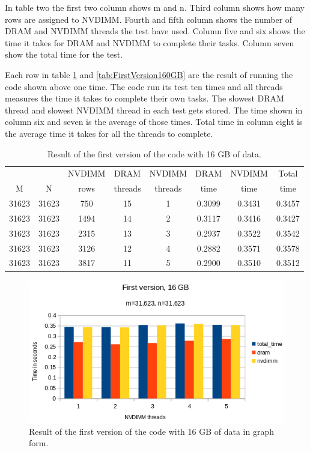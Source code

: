 \documentclass[12pt,a4paper,USenglish]{article}      %
\begin{document}
In table two the first two column shows m and n. Third column shows how many rows are assigned to NVDIMM. Fourth and fifth column shows the number of DRAM and NVDIMM threads the test have used.
Column five and six shows the time it takes for DRAM and NVDIMM to complete their tasks. Column seven show the total time for the test.

Each row in table \ref{tab:FirstVersion16GB} and \ref{tab:FirstVersion160GB} are the result of running the code shown above one time. The code run its test ten times and all threads measures the time it takes to complete their own tasks. The slowest DRAM thread and slowest NVDIMM thread in each test gets stored. The time shown in column six and seven is the average of those times. Total time in column eight is the average time it takes for all the threads to complete.

\begin{table}[!hbtp]
\begin{tabular}{ |c|c|c|c|c|c|c|c| }
\hline
&  & NVDIMM & DRAM & NVDIMM & DRAM & NVDIMM & Total \\
M & N & rows & threads & threads & time & time & time \\
\hline
31623 & 31623 & 750 & 15 & 1 & 0.3099 & 0.3431 & 0.3457 \\
\hline
31623 & 31623 & 1494 & 14 & 2 & 0.3117 & 0.3416 & 0.3427 \\
\hline
31623 & 31623 & 2315 & 13 & 3 & 0.2937 & 0.3522 & 0.3542 \\
\hline
31623 & 31623 & 3126 & 12 & 4 & 0.2882 & 0.3571 & 0.3578 \\
\hline
31623 & 31623 & 3817 & 11 & 5 & 0.2900 & 0.3510 & 0.3512 \\
\hline
\end{tabular}
\caption{Result of the first version of the code with 16 GB of data.}
\label{tab:FirstVersion16GB}
\end{table}
\begin{figure}[!hbtp]
\includegraphics[scale=0.7]{Large_Array_test/First_version_16GB.png}
\caption{Result of the first version of the code with 16 GB of data in graph form.}
\label{fig:FirstVersion16GB}
\end{figure}
\end{document}
